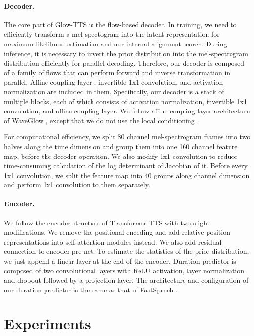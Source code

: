 \documentclass{article}
\begin{document}
\paragraph{Decoder.} The core part of Glow-TTS is the flow-based decoder. In training, we need to efficiently transform a mel-spectogram into the latent representation for maximum likelihood estimation and our internal alignment search. During inference, it is necessary to invert the prior distribution into the mel-spectrogram distribution efficiently for parallel decoding. Therefore, our decoder is composed of a family of flows that can perform forward and inverse transformation in parallel. Affine coupling layer \cite{dinh2014nice,dinh2016density}, invertible 1x1 convolution, and activation normalization \cite{kingma2018glow} are included in them. Specifically, our decoder is a stack of multiple blocks, each of which consists of activation normalization, invertible 1x1 convolution, and affine coupling layer. We follow affine coupling layer architecture of WaveGlow \cite{prenger2019waveglow}, except that we do not use the local conditioning \cite{van2016wavenet}.

For computational efficiency, we split 80 channel mel-spectrogram frames into two halves along the time dimension and group them into one 160 channel feature map, before the decoder operation. We also modify 1x1 convolution to reduce time-consuming calculation of the log determinant of Jacobian of it. Before every 1x1 convolution, we split the feature map into 40 groups along channel dimension and perform 1x1 convolution to them separately.

\paragraph{Encoder.}We follow the encoder structure of Transformer TTS \cite{li2019neural} with two slight modifications. We remove the positional encoding and add relative position representations \cite{shaw2018self} into self-attention modules instead. We also add residual connection to encoder pre-net. To estimate the statistics of the prior distribution, we just append a linear layer at the end of the encoder. Duration predictor is composed of two convolutional layers with ReLU activation, layer normalization and dropout followed by a projection layer. The architecture and configuration of our duration predictor is the same as that of FastSpeech \cite{ren2019fastspeech}.


\section{Experiments}
\end{document}

